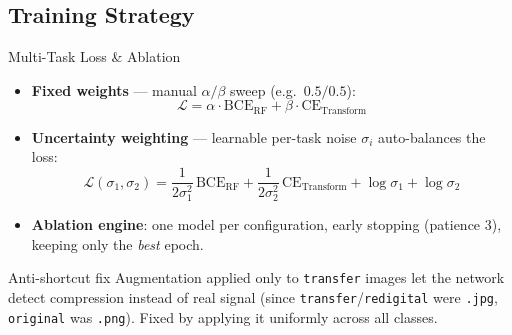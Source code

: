 \subsection{Training Strategy}

\begin{frame}{Multi-Task Loss \& Ablation}
  \footnotesize
  \setlength{\abovedisplayskip}{3pt}
  \setlength{\belowdisplayskip}{3pt}
  \begin{itemize}
    \item \textbf{Fixed weights} — manual $\alpha/\beta$ sweep (e.g.\ $0.5/0.5$):
    \[
      \mathcal{L} = \alpha \cdot \text{BCE}_{\text{RF}} + \beta \cdot \text{CE}_{\text{Transform}}
    \]
    \item \textbf{Uncertainty weighting} \cite{kendall2018multitask} — learnable per-task noise $\sigma_i$ auto-balances the loss:
    \[
      \mathcal{L}(\sigma_1,\sigma_2) = \frac{1}{2\sigma_1^{2}}\,\text{BCE}_{\text{RF}} + \frac{1}{2\sigma_2^{2}}\,\text{CE}_{\text{Transform}} + \log\sigma_1 + \log\sigma_2
    \]
    \item \textbf{Ablation engine}: one model per configuration, early stopping (patience 3), keeping only the \emph{best} epoch.
  \end{itemize}

  \begin{alertblock}{Anti-shortcut fix}
    \footnotesize Augmentation applied only to \texttt{transfer} images let the network detect compression instead of real signal (since \texttt{transfer}/\texttt{redigital} were \texttt{.jpg}, \texttt{original} was \texttt{.png}). Fixed by applying it uniformly across all classes.
  \end{alertblock}
\end{frame}
